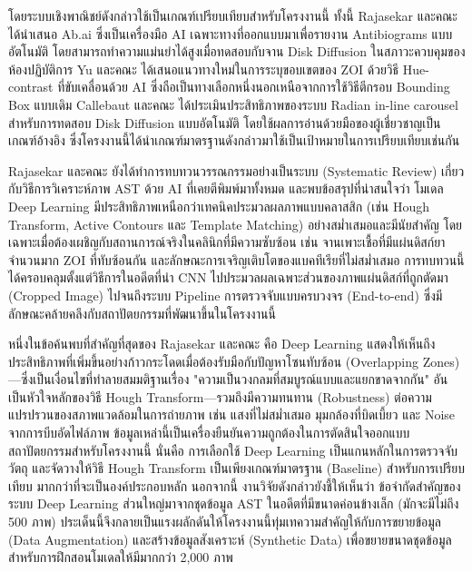 โดยระบบเชิงพาณิชย์ดังกล่าวใช้เป็นเกณฑ์เปรียบเทียบสำหรับโครงงานนี้ ทั้งนี้ Rajasekar และคณะ \cite{rajasekar2022} ได้นำเสนอ Ab.ai ซึ่งเป็นเครื่องมือ AI เฉพาะทางที่ออกแบบมาเพื่อรายงาน Antibiograms แบบอัตโนมัติ โดยสามารถทำความแม่นยำได้สูงเมื่อทดสอบกับจาน Disk Diffusion ในสภาวะควบคุมของห้องปฏิบัติการ
Yu และคณะ \cite{yu2025} ได้เสนอแนวทางใหม่ในการระบุขอบเขตของ ZOI ด้วยวิธี Hue-contrast ที่ขับเคลื่อนด้วย AI ซึ่งถือเป็นทางเลือกหนึ่งนอกเหนือจากการใช้วิธีตีกรอบ Bounding Box แบบเดิม
Callebaut และคณะ \cite{callebaut2024} ได้ประเมินประสิทธิภาพของระบบ Radian\textregistered{} in-line carousel สำหรับการทดสอบ Disk Diffusion แบบอัตโนมัติ โดยใช้ผลการอ่านด้วยมือของผู้เชี่ยวชาญเป็นเกณฑ์อ้างอิง ซึ่งโครงงานนี้ได้นำเกณฑ์มาตรฐานดังกล่าวมาใช้เป็นเป้าหมายในการเปรียบเทียบเช่นกัน

Rajasekar และคณะ \cite{rajasekar2023} ยังได้ทำการทบทวนวรรณกรรมอย่างเป็นระบบ (Systematic Review) เกี่ยวกับวิธีการวิเคราะห์ภาพ AST ด้วย AI ที่เคยตีพิมพ์มาทั้งหมด และพบข้อสรุปที่น่าสนใจว่า โมเดล Deep Learning มีประสิทธิภาพเหนือกว่าเทคนิคประมวลผลภาพแบบคลาสสิก (เช่น Hough Transform, Active Contours และ Template Matching) อย่างสม่ำเสมอและมีนัยสำคัญ โดยเฉพาะเมื่อต้องเผชิญกับสถานการณ์จริงในคลินิกที่มีความซับซ้อน เช่น จานเพาะเชื้อที่มีแผ่นดิสก์ยาจำนวนมาก ZOI ที่ทับซ้อนกัน และลักษณะการเจริญเติบโตของแบคทีเรียที่ไม่สม่ำเสมอ การทบทวนนี้ได้ครอบคลุมตั้งแต่วิธีการในอดีตที่นำ CNN ไปประมวลผลเฉพาะส่วนของภาพแผ่นดิสก์ที่ถูกตัดมา (Cropped Image) ไปจนถึงระบบ Pipeline การตรวจจับแบบครบวงจร (End-to-end) ซึ่งมีลักษณะคล้ายคลึงกับสถาปัตยกรรมที่พัฒนาขึ้นในโครงงานนี้

หนึ่งในข้อค้นพบที่สำคัญที่สุดของ Rajasekar และคณะ คือ Deep Learning แสดงให้เห็นถึงประสิทธิภาพที่เพิ่มขึ้นอย่างก้าวกระโดดเมื่อต้องรับมือกับปัญหาโซนทับซ้อน (Overlapping Zones)---ซึ่งเป็นเงื่อนไขที่ทำลายสมมติฐานเรื่อง "ความเป็นวงกลมที่สมบูรณ์แบบและแยกขาดจากกัน" อันเป็นหัวใจหลักของวิธี Hough Transform---รวมถึงมีความทนทาน (Robustness) ต่อความแปรปรวนของสภาพแวดล้อมในการถ่ายภาพ เช่น แสงที่ไม่สม่ำเสมอ มุมกล้องที่บิดเบี้ยว และ Noise จากการบีบอัดไฟล์ภาพ \cite{rajasekar2023} ข้อมูลเหล่านี้เป็นเครื่องยืนยันความถูกต้องในการตัดสินใจออกแบบสถาปัตยกรรมสำหรับโครงงานนี้ นั่นคือ การเลือกใช้ Deep Learning เป็นแกนหลักในการตรวจจับวัตถุ และจัดวางให้วิธี Hough Transform เป็นเพียงเกณฑ์มาตรฐาน (Baseline) สำหรับการเปรียบเทียบ มากกว่าที่จะเป็นองค์ประกอบหลัก นอกจากนี้ งานวิจัยดังกล่าวยังชี้ให้เห็นว่า ข้อจำกัดสำคัญของระบบ Deep Learning ส่วนใหญ่มาจากชุดข้อมูล AST ในอดีตที่มีขนาดค่อนข้างเล็ก (มักจะมีไม่ถึง 500 ภาพ) ประเด็นนี้จึงกลายเป็นแรงผลักดันให้โครงงานนี้ทุ่มเทความสำคัญให้กับการขยายข้อมูล (Data Augmentation) และสร้างข้อมูลสังเคราะห์ (Synthetic Data) เพื่อขยายขนาดชุดข้อมูลสำหรับการฝึกสอนโมเดลให้มีมากกว่า 2,000 ภาพ

